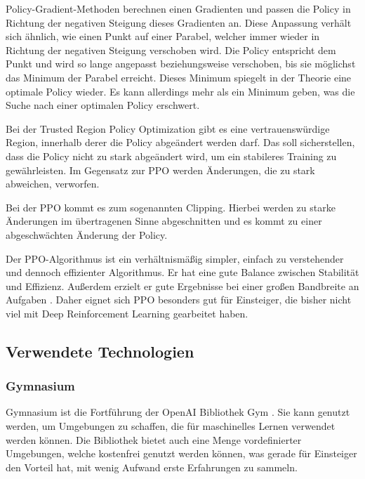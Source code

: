 Policy-Gradient-Methoden berechnen einen Gradienten und passen die Policy in Richtung der negativen Steigung dieses Gradienten an. Diese Anpassung verhält sich ähnlich, wie einen Punkt auf einer Parabel, welcher immer wieder in Richtung der negativen Steigung verschoben wird. Die Policy entspricht dem Punkt und wird so lange angepasst beziehungsweise verschoben, bis sie möglichst das Minimum der Parabel erreicht. Dieses Minimum spiegelt in der Theorie eine optimale Policy wieder. Es kann allerdings mehr als ein Minimum geben, was die Suche nach einer optimalen Policy erschwert.

Bei der Trusted Region Policy Optimization gibt es eine vertrauenswürdige Region, innerhalb derer die Policy abgeändert werden darf. Das soll sicherstellen, dass die Policy nicht zu stark abgeändert wird, um ein stabileres Training zu gewährleisten. Im Gegensatz zur PPO werden Änderungen, die zu stark abweichen, verworfen.

Bei der PPO kommt es zum sogenannten Clipping. Hierbei werden zu starke Änderungen im übertragenen Sinne abgeschnitten und es kommt zu einer abgeschwächten Änderung der Policy.

Der PPO-Algorithmus ist ein verhältnismäßig simpler, einfach zu verstehender und dennoch effizienter Algorithmus. Er hat eine gute Balance zwischen Stabilität und Effizienz. Außerdem erzielt er gute Ergebnisse bei einer großen Bandbreite an Aufgaben \cite{schulman_proximal_2017}. Daher eignet sich PPO besonders gut für Einsteiger, die bisher nicht viel mit Deep Reinforcement Learning gearbeitet haben.
\subsection{Verwendete Technologien}
\subsubsection{Gymnasium}
Gymnasium ist die Fortführung der OpenAI Bibliothek Gym \cite{noauthor_gymnasium_nodate}. Sie kann genutzt werden, um Umgebungen zu schaffen, die für maschinelles Lernen verwendet werden können. Die Bibliothek bietet auch eine Menge vordefinierter Umgebungen, welche kostenfrei genutzt werden können, was gerade für Einsteiger den Vorteil hat, mit wenig Aufwand erste Erfahrungen zu sammeln.

